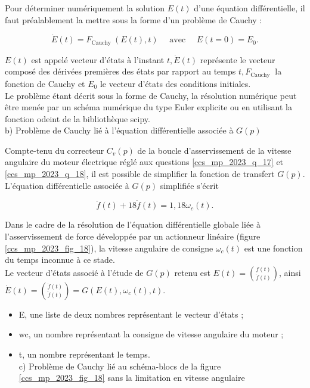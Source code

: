 Pour déterminer numériquement la solution $E(t)$ d'une équation différentielle, il faut préalablement la mettre sous la forme d'un problème de Cauchy :

$$
\dot{E}(t)=F_{\text {Cauchy }}(E(t), t) \quad \text { avec } \quad E(t=0)=E_{0} .
$$

$E(t)$ est appelé vecteur d'états à l'instant $t, \dot{E}(t)$ représente le vecteur composé des dérivées premières des états par rapport au temps $t, F_{\text {Cauchy }}$ la fonction de Cauchy et $E_{0}$ le vecteur d'états des conditions initiales.\\
Le problème étant décrit sous la forme de Cauchy, la résolution numérique peut être menée par un schéma numérique du type Euler explicite ou en utilisant la fonction odeint de la bibliothèque scipy.\\
b) Problème de Cauchy lié à l'équation différentielle associée à $G(p)$

Compte-tenu du correcteur $C_{v}(p)$ de la boucle d'asservissement de la vitesse angulaire du moteur électrique réglé aux questions \ref{ccs_mp_2023_q_17} et \ref{ccs_mp_2023_q_18}, il est possible de simplifier la fonction de transfert $G(p)$. L'équation différentielle associée à $G(p)$ simplifiée s'écrit

$$
\ddot{f}(t)+18 \dot{f}(t)=1,18 \omega_{c}(t) .
$$

Dans le cadre de la résolution de l'équation différentielle globale liée à l'asservissement de force développée par un actionneur linéaire (figure \ref{ccs_mp_2023_fig_18}), la vitesse angulaire de consigne $\omega_{c}(t)$ est une fonction du temps inconnue à ce stade.\\
Le vecteur d'états associé à l'étude de $G(p)$ retenu est $E(t)=\binom{f(t)}{\dot{f}(t)}$, ainsi $\dot{E}(t)=\binom{\dot{f}(t)}{\ddot{f}(t)}=G\left(E(t), \omega_{c}(t), t\right)$.\\
\ifprof
\begin{corrige}
\end{corrige}
\else
\fi


\begin{itemize}
  \item E, une liste de deux nombres représentant le vecteur d'états ;
  \item wc, un nombre représentant la consigne de vitesse angulaire du moteur ;
  \item t, un nombre représentant le temps.\\
c) Problème de Cauchy lié au schéma-blocs de la figure \ref{ccs_mp_2023_fig_18} sans la limitation en vitesse angulaire
\end{itemize}
\ifprof
\begin{corrige}
\end{corrige}
\else
\fi



